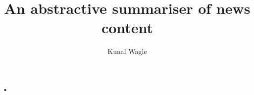 \documentclass[10pt,a4paper,twoside]{report}
\author{Kunal Wagle}
\title{An abstractive summariser of news content}
\begin{document}
•
\end{document}
